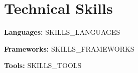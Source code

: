 \documentclass[letterpaper,11pt]{article}
\begin{document}
\section{Technical Skills}
\begin{itemize}[leftmargin=0.15in, label={}]
  \small{
    \item \textbf{Languages:}  {{SKILLS_LANGUAGES}}  \\
    \item \textbf{Frameworks:} {{SKILLS_FRAMEWORKS}} \\
    \item \textbf{Tools:}      {{SKILLS_TOOLS}}
  }
\end{itemize}

\end{document}
